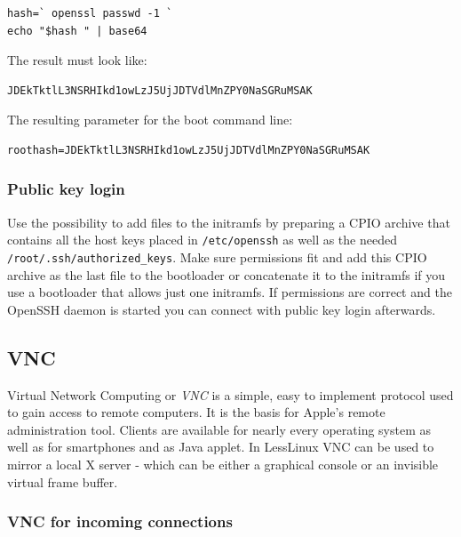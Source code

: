 \begin{verbatim}
hash=` openssl passwd -1 `
echo "$hash " | base64 
\end{verbatim}

The result must look like:

\begin{verbatim}
JDEkTktlL3NSRHIkd1owLzJ5UjJDTVdlMnZPY0NaSGRuMSAK
\end{verbatim}

The resulting parameter for the boot command line:

\begin{verbatim}
roothash=JDEkTktlL3NSRHIkd1owLzJ5UjJDTVdlMnZPY0NaSGRuMSAK
\end{verbatim} 

\subsubsection{Public key login}

Use the possibility to add files to the initramfs by preparing a CPIO archive that contains all the host keys placed in \texttt{/etc/openssh} as well as the needed \texttt{/root/.ssh/authorized\_keys}. Make sure permissions fit and add this CPIO archive as the last file to the bootloader or concatenate it to the initramfs if you use a bootloader that allows just one initramfs. If permissions are correct and the OpenSSH daemon is started you can connect with public key login afterwards.

\subsection{VNC}

Virtual Network Computing or \emph{VNC} is a simple, easy to implement protocol used to gain access to remote computers. It is the basis for Apple's remote administration tool. Clients are available for nearly every operating system as well as for smartphones and as Java applet. In LessLinux VNC can be used to mirror a local X server - which can be either a graphical console or an invisible virtual frame buffer.


\subsubsection{VNC for incoming connections}


